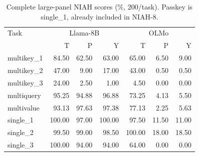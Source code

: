 \begin{table}[ht]
\centering\small
\caption{Complete large-panel NIAH scores (\%, $200$/task). Passkey is single\_1, already included in NIAH-8.}
\label{tab:three-method-tasks-lo}
\begin{tabular}{@{}lrrrrrr@{}}
\toprule
Task & \multicolumn{3}{c}{Llama-8B} & \multicolumn{3}{c}{OLMo} \\
 & T & P & Y & T & P & Y \\
\midrule
multikey\_1 & 84.50 & 62.50 & 63.00 & 65.00 & 6.50 & 9.00 \\
multikey\_2 & 47.00 & 9.00 & 17.00 & 43.00 & 0.50 & 0.50 \\
multikey\_3 & 24.00 & 2.50 & 1.00 & 4.50 & 0.00 & 0.00 \\
multiquery & 95.25 & 94.88 & 96.88 & 73.25 & 4.13 & 5.50 \\
multivalue & 93.13 & 97.63 & 97.38 & 77.13 & 2.25 & 5.63 \\
single\_1 & 100.00 & 97.00 & 100.00 & 97.50 & 11.50 & 11.00 \\
single\_2 & 99.50 & 99.00 & 98.50 & 100.00 & 18.00 & 18.50 \\
single\_3 & 100.00 & 94.00 & 94.00 & 64.00 & 0.00 & 0.00 \\
\bottomrule
\end{tabular}
\end{table}
